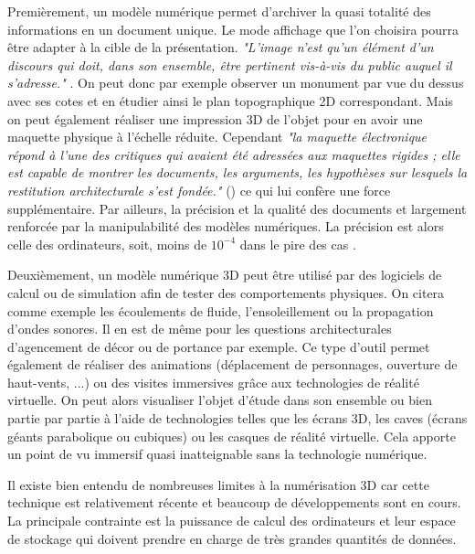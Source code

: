 		Premièrement, un modèle numérique permet d'archiver la quasi totalité des informations en un document unique. Le mode affichage que l'on choisira pourra être adapter à la cible de la présentation. \textit{"L’image n’est qu’un élément d’un discours qui doit, dans son ensemble, être
pertinent vis-à-vis du public auquel il s’adresse."} \cite{golvin}. On peut donc par exemple observer un monument par vue du dessus avec ses cotes et en étudier ainsi le plan topographique 2D correspondant. Mais on peut également réaliser une impression 3D de l'objet pour en avoir une maquette physique à l'échelle réduite. Cependant \textit{"la maquette électronique répond à l’une des critiques qui avaient été adressées aux maquettes rigides ; elle est capable de montrer les documents, les arguments, les hypothèses sur lesquels la restitution architecturale s’est fondée."} (\cite{golvin}) ce qui lui confère une force supplémentaire. Par ailleurs, la précision et la qualité des documents et largement renforcée par la manipulabilité des modèles numériques. La précision est alors celle des ordinateurs, soit, moins de $10^{-4}$ dans le pire des cas \cite{precisionmachine}. 
		 
		 Deuxièmement, un modèle numérique 3D peut être utilisé par des logiciels de calcul ou de simulation afin de tester des comportements physiques. On citera comme exemple les écoulements de fluide, l'ensoleillement ou la propagation d'ondes sonores. Il en est de même pour les questions architecturales d'agencement de décor ou de portance par exemple. Ce type d'outil permet également de réaliser des animations (déplacement de personnages, ouverture de haut-vents, ...) ou des visites immersives grâce aux technologies de réalité virtuelle. On peut alors visualiser l'objet d'étude dans son ensemble ou bien partie par partie à l'aide de technologies telles que les écrans 3D, les caves (écrans géants parabolique ou cubiques) ou les casques de réalité virtuelle. Cela apporte un point de vu immersif quasi inatteignable sans la technologie numérique.
		 
Il existe bien entendu de nombreuses limites à la numérisation 3D car cette technique est relativement récente et beaucoup de développements sont en cours. La principale contrainte est la puissance de calcul des ordinateurs et leur espace de stockage qui doivent prendre en charge de très grandes quantités de données.

